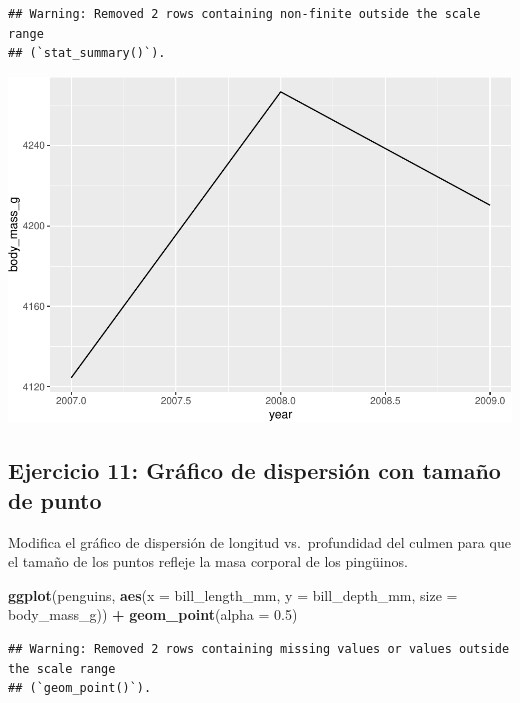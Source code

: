 \documentclass[
]{book}
\newenvironment{Shaded}{\begin{snugshade}}{\end{snugshade}}
\newcommand{\AttributeTok}[1]{\textcolor[rgb]{0.13,0.29,0.53}{#1}}
\newcommand{\FloatTok}[1]{\textcolor[rgb]{0.00,0.00,0.81}{#1}}
\newcommand{\FunctionTok}[1]{\textcolor[rgb]{0.13,0.29,0.53}{\textbf{#1}}}
\newcommand{\NormalTok}[1]{#1}
\newcommand{\SpecialCharTok}[1]{\textcolor[rgb]{0.81,0.36,0.00}{\textbf{#1}}}
\begin{document}
\begin{verbatim}
## Warning: Removed 2 rows containing non-finite outside the scale range
## (`stat_summary()`).
\end{verbatim}

\includegraphics{bookdown-demo_files/figure-latex/unnamed-chunk-186-1.pdf}

\hypertarget{ejercicio-11-gruxe1fico-de-dispersiuxf3n-con-tamauxf1o-de-punto}{%
\subsection{Ejercicio 11: Gráfico de dispersión con tamaño de punto}\label{ejercicio-11-gruxe1fico-de-dispersiuxf3n-con-tamauxf1o-de-punto}}

Modifica el gráfico de dispersión de longitud vs.~profundidad del culmen para que el tamaño de los puntos refleje la masa corporal de los pingüinos.

\begin{Shaded}
\begin{Highlighting}[]
\FunctionTok{ggplot}\NormalTok{(penguins, }\FunctionTok{aes}\NormalTok{(}\AttributeTok{x =}\NormalTok{ bill\_length\_mm, }\AttributeTok{y =}\NormalTok{ bill\_depth\_mm, }\AttributeTok{size =}\NormalTok{ body\_mass\_g)) }\SpecialCharTok{+}
  \FunctionTok{geom\_point}\NormalTok{(}\AttributeTok{alpha =} \FloatTok{0.5}\NormalTok{)}
\end{Highlighting}
\end{Shaded}

\begin{verbatim}
## Warning: Removed 2 rows containing missing values or values outside the scale range
## (`geom_point()`).
\end{verbatim}
\end{document}
